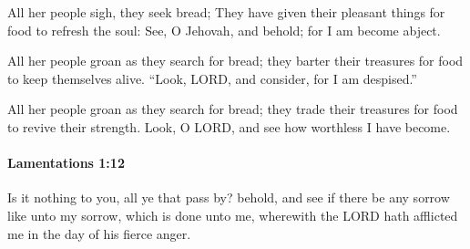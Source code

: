 			\begin{versebox}
					\item[BHS] 
					\item[LXX] 
					\item[ASV] All her people sigh, they seek bread; They have given their pleasant things for food to refresh the soul: See, O Jehovah, and behold; for I am become abject.
					\item[NIV] All her people groan as they search for bread; they barter their treasures for food to keep themselves alive. “Look, LORD, and consider, for I am despised.”
					\item[NRSV] All her people groan as they search for bread; they trade their treasures for food to revive their strength. Look, O LORD, and see how worthless I have become.
			\end{versebox}

		\paragraph{Lamentations 1:12} %
			\label{LAMENTATIONS-1-12}

			Is it nothing to you, all ye that pass by? behold, and see if there be any sorrow like unto my sorrow, which is done unto me, wherewith the LORD hath afflicted me in the day of his fierce anger.

